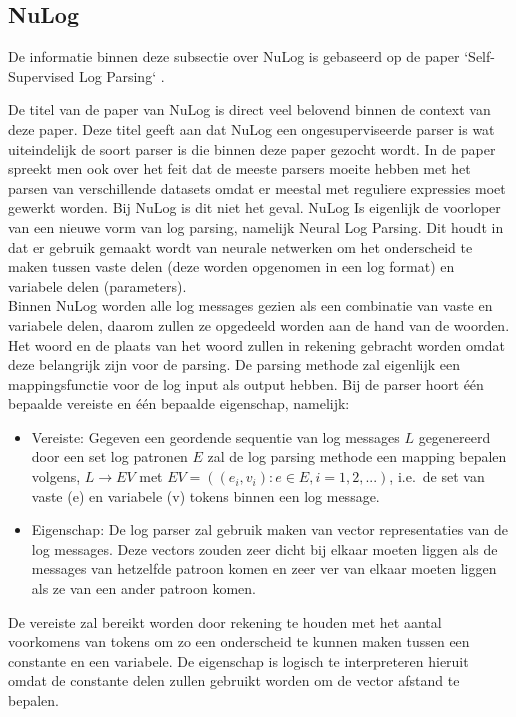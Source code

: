 \subsection{NuLog}
De informatie binnen deze subsectie over NuLog is gebaseerd op de paper `Self-Supervised Log Parsing` \autocite{SSLP2020}.

De titel van de paper van NuLog is direct veel belovend binnen de context van deze paper. Deze titel geeft aan dat NuLog een ongesuperviseerde parser is wat uiteindelijk de soort parser is die binnen deze paper gezocht wordt. In de paper spreekt men ook over het feit dat de meeste parsers moeite hebben met het parsen van verschillende datasets omdat er meestal met reguliere expressies moet gewerkt worden. Bij NuLog is dit niet het geval. NuLog Is eigenlijk de voorloper van een nieuwe vorm van log parsing, namelijk Neural Log Parsing. Dit houdt in dat er gebruik gemaakt wordt van neurale netwerken om het onderscheid te maken tussen vaste delen (deze worden opgenomen in een log format) en variabele delen (parameters).\\

Binnen NuLog worden alle log messages gezien als een combinatie van vaste en variabele delen, daarom zullen ze opgedeeld worden aan de hand van de woorden. Het woord en de plaats van het woord zullen in rekening gebracht worden omdat deze belangrijk zijn voor de parsing. De parsing methode zal eigenlijk een mappingsfunctie voor de log input als output hebben. Bij de parser hoort één bepaalde vereiste en één bepaalde eigenschap, namelijk:
\begin{itemize}
    \item Vereiste: Gegeven een geordende sequentie van log messages $L$ gegenereerd door een set log patronen $E$ zal de log parsing methode een mapping bepalen volgens, $L \longrightarrow EV$ met $EV = ((e_{i}, v_{i}): e \in E, i = 1, 2, ...)$, i.e.\ de set van vaste (e) en variabele (v) tokens binnen een log message. 
    \item Eigenschap: De log parser zal gebruik maken van vector representaties van de log messages. Deze vectors zouden zeer dicht bij elkaar moeten liggen als de messages van hetzelfde patroon komen en zeer ver van elkaar moeten liggen als ze van een ander patroon komen. 
\end{itemize}

De vereiste zal bereikt worden door rekening te houden met het aantal voorkomens van tokens om zo een onderscheid te kunnen maken tussen een constante en een variabele. De eigenschap is logisch te interpreteren hieruit omdat de constante delen zullen gebruikt worden om de vector afstand te bepalen.\\


